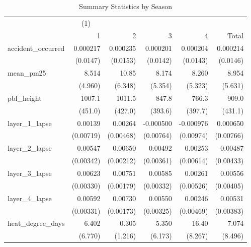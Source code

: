 \begin{table}[htbp]\centering
\caption{Summary Statistics by Season\label{sumstats\_season}}
\begin{tabular}{l*{5}{D{.}{.}{-1}}}
\toprule
                    &&            &            &            &            \\
                    &           1&           2&           3&           4&       Total\\
\midrule
accident\_occurred   &    0.000217&    0.000235&    0.000201&    0.000204&    0.000214\\
                    &    (0.0147)&    (0.0153)&    (0.0142)&    (0.0143)&    (0.0146)\\
\addlinespace
mean\_pm25           &       8.514&       10.85&       8.174&       8.260&       8.954\\
                    &     (4.960)&     (6.348)&     (5.354)&     (5.323)&     (5.631)\\
\addlinespace
pbl\_height          &      1007.1&      1011.5&       847.8&       766.3&       909.0\\
                    &     (451.0)&     (427.0)&     (393.6)&     (397.7)&     (431.1)\\
\addlinespace
layer\_1\_lapse       &     0.00139&     0.00264&   -0.000500&   -0.000976&    0.000650\\
                    &   (0.00719)&   (0.00468)&   (0.00764)&   (0.00974)&   (0.00766)\\
\addlinespace
layer\_2\_lapse       &     0.00547&     0.00650&     0.00492&     0.00253&     0.00487\\
                    &   (0.00342)&   (0.00212)&   (0.00361)&   (0.00614)&   (0.00433)\\
\addlinespace
layer\_3\_lapse       &     0.00623&     0.00751&     0.00585&     0.00261&     0.00556\\
                    &   (0.00330)&   (0.00179)&   (0.00332)&   (0.00526)&   (0.00405)\\
\addlinespace
layer\_4\_lapse       &     0.00592&     0.00730&     0.00550&     0.00246&     0.00531\\
                    &   (0.00331)&   (0.00173)&   (0.00325)&   (0.00469)&   (0.00383)\\
\addlinespace
heat\_degree\_days    &       6.402&       0.305&       5.350&       16.40&       7.074\\
                    &     (6.770)&     (1.216)&     (6.173)&     (8.267)&     (8.496)\\

\end{tabular}
\end{table}
